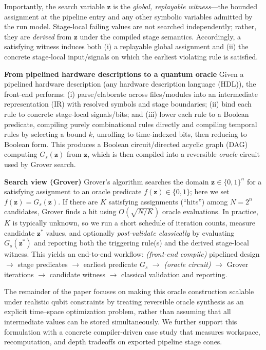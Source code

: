 \documentclass[conference]{IEEEtran}
\newcommand{\zvec}{\mathbf{z}}
\begin{document}
Importantly, the search variable $\zvec$ is the \emph{global, replayable witness}---the bounded assignment at the pipeline entry and any other symbolic variables admitted by the run model. Stage-local failing values are not searched independently; rather, they are \emph{derived} from $\zvec$ under the compiled stage semantics. Accordingly, a satisfying witness induces both (i) a replayable global assignment and (ii) the concrete stage-local input/signals on which the earliest violating rule is satisfied.

\textbf{From pipelined hardware descriptions to a quantum oracle}
Given a pipelined hardware description (any hardware description language (HDL)), the front-end performs: (i) parse/elaborate across files/modules into an intermediate representation (IR) with resolved symbols and stage boundaries; (ii) bind each rule to concrete stage-local signals/bits; and (iii) lower each rule to a Boolean predicate, compiling purely combinational rules directly and compiling temporal rules by selecting a bound $k$, unrolling to time-indexed bits, then reducing to Boolean form. This produces a Boolean circuit/directed acyclic graph (DAG) computing $G_s(\zvec)$ from $\zvec$, which is then compiled into a reversible \emph{oracle} circuit used by Grover search.\cite{bennett1973logical}

\textbf{Search view (Grover)}
Grover’s algorithm searches the domain $\zvec\in\{0,1\}^n$ for a satisfying assignment to an oracle predicate $f(\zvec)\in\{0,1\}$; here we set $f(\zvec)=G_s(\zvec)$.\cite{grover1996,brassard2002amplification} If there are $K$ satisfying assignments (“hits”) among $N=2^n$ candidates, Grover finds a hit using $O(\sqrt{N/K})$ oracle evaluations.\cite{grover1996,boyer1998tight} In practice, $K$ is typically unknown, so we run a short schedule of iteration counts, measure candidate $\zvec^\ast$ values, and optionally \emph{post-validate classically} by evaluating $G_s(\zvec^\ast)$ and reporting both the triggering rule(s) and the derived stage-local witness.\cite{boyer1998tight} This yields an end-to-end workflow: \emph{(front-end compile)} pipelined design $\rightarrow$ stage predicates $\rightarrow$ earliest predicate $G_s$ $\rightarrow$ \emph{(oracle circuit)} $\rightarrow$ Grover iterations $\rightarrow$ candidate witness $\rightarrow$ classical validation and reporting.

The remainder of the paper focuses on making this oracle construction scalable under realistic qubit constraints by treating reversible oracle synthesis as an explicit time--space optimization problem, rather than assuming that all intermediate values can be stored simultaneously.\cite{bennett1989timespace} We further support this formulation with a concrete compiler-driven case study that measures workspace, recomputation, and depth tradeoffs on exported pipeline stage cones.
\end{document}
